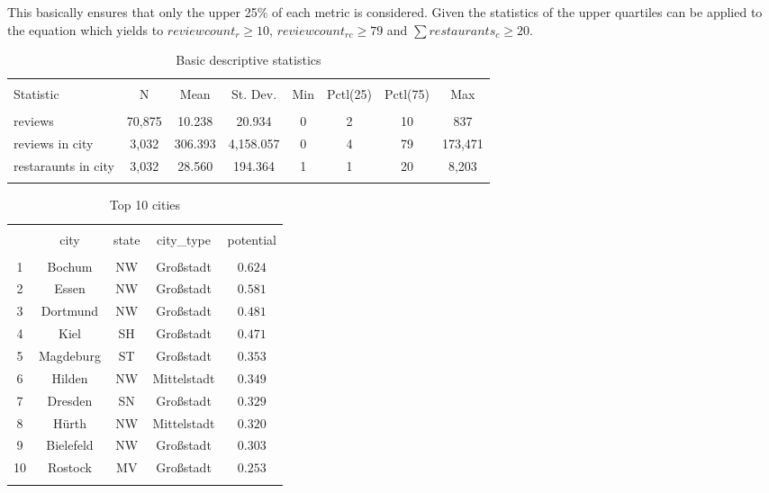 This basically ensures that only the upper 25\% of each metric is considered.
Given the statistics of  the upper quartiles can be applied to the equation which yields to $reviewcount_{r} \geq 10 $, $reviewcount_{rc} \geq 79$ and $\sum restaurants_{c} \geq 20$.
\begin{table}[!htbp] \centering
	\caption{Basic descriptive statistics}
	\label{tab:stats}
	\begin{tabular}{@{\extracolsep{5pt}}lccccccc}
		\\[-1.8ex]\hline
		\hline \\[-1.8ex]
		Statistic & \multicolumn{1}{c}{N} & \multicolumn{1}{c}{Mean} & \multicolumn{1}{c}{St. Dev.} & \multicolumn{1}{c}{Min} & \multicolumn{1}{c}{Pctl(25)} & \multicolumn{1}{c}{Pctl(75)} & \multicolumn{1}{c}{Max} \\
		\hline \\[-1.8ex]
		reviews & 70,875 & 10.238 & 20.934 & 0 & 2 & 10 & 837 \\
		reviews in city & 3,032 & 306.393 & 4,158.057 & 0 & 4 & 79 & 173,471 \\
		restaraunts in city & 3,032 & 28.560 & 194.364 & 1 & 1 & 20 & 8,203 \\
		\hline \\[-1.8ex]
	\end{tabular}
\end{table}
\begin{table}[!htbp] \centering
	\caption{Top 10 cities}
	\label{tab:top10cities}
	\begin{tabular}{@{\extracolsep{5pt}} ccccc}
		\\[-1.8ex]\hline
		\hline \\[-1.8ex]
		& city & state & city\_type & potential \\
		\hline \\[-1.8ex]
		1 & Bochum & NW & Großstadt & $0.624$ \\
		2 & Essen & NW & Großstadt & $0.581$ \\
		3 & Dortmund & NW & Großstadt & $0.481$ \\
		4 & Kiel & SH & Großstadt & $0.471$ \\
		5 & Magdeburg & ST & Großstadt & $0.353$ \\
		6 & Hilden & NW & Mittelstadt & $0.349$ \\
		7 & Dresden & SN & Großstadt & $0.329$ \\
		8 & Hürth & NW & Mittelstadt & $0.320$ \\
		9 & Bielefeld & NW & Großstadt & $0.303$ \\
		10 & Rostock & MV & Großstadt & $0.253$ \\
		\hline \\[-1.8ex]
	\end{tabular}
\end{table}
